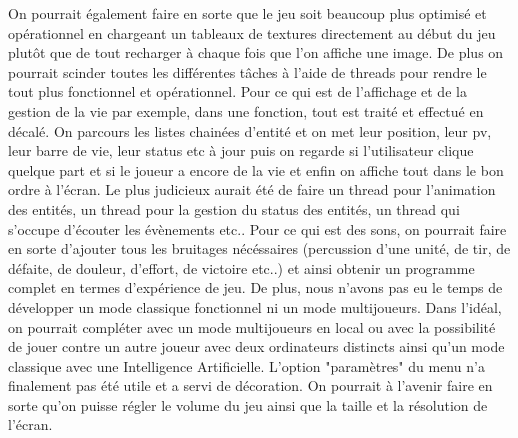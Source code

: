 \documentclass[a4paper,11pt]{article}
\begin{document}
On pourrait également faire en sorte que le jeu soit beaucoup plus optimisé et opérationnel en chargeant un tableaux de textures
directement au début du jeu plutôt que de tout recharger à chaque fois que l'on affiche une image. De plus on pourrait
scinder toutes les différentes tâches à l'aide de threads pour rendre le tout plus fonctionnel et opérationnel. Pour ce qui est de 
l'affichage et de la gestion de la vie par exemple, dans une fonction, tout est traité et effectué en décalé. On parcours les listes chainées d'entité
et on met leur position, leur pv, leur barre de vie, leur status etc à jour puis on regarde si l'utilisateur clique quelque part et si le joueur
a encore de la vie et enfin on affiche tout dans le bon ordre à l'écran. Le plus judicieux aurait été de faire un thread pour l'animation des entités,
un thread pour la gestion du status des entités, un thread qui s'occupe d'écouter les évènements etc..
Pour ce qui est des sons, on pourrait faire en sorte d'ajouter tous les bruitages nécéssaires (percussion d'une unité,
de tir, de défaite, de douleur, d'effort, de victoire etc..) et ainsi obtenir un programme complet en termes d'expérience de jeu.
De plus, nous n'avons pas eu le temps de développer un mode classique fonctionnel ni un mode multijoueurs.
Dans l'idéal, on pourrait compléter avec un mode multijoueurs en local ou avec la possibilité de jouer contre un autre joueur
avec deux ordinateurs distincts ainsi qu'un mode classique avec une Intelligence Artificielle.
L'option "paramètres" du menu n'a finalement pas été utile et a servi de décoration. On pourrait à l'avenir
faire en sorte qu'on puisse régler le volume du jeu ainsi que la taille et la résolution de l'écran.
\end{document}
